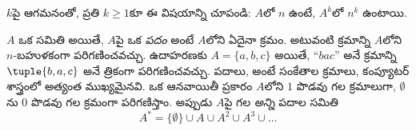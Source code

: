 \documentclass[../../../include/open-logic-section]{subfiles}
\begin{document}
\begin{prob}
$k$పై ఆగమనంతో, ప్రతి $k \ge 1$కూ ఈ విషయాన్ని చూపండి:
$A$లో $n$  ఉంటే, $A^k$లో $n^k$  ఉంటాయి.
\end{prob}

\begin{ex}
$A$ ఒక సమితి అయితే, $A$పై ఒక \emph{పదం} అంటే $A$లోని
 ఏదైనా క్రమం. అటువంటి క్రమాన్ని $A$లోని
 $n$-బహుళకంగా పరిగణించవచ్చు.
ఉదాహరణకు $A = \{a, b, c\}$ అయితే, ``$bac$'' అనే క్రమాన్ని
$\tuple{b, a, c}$ అనే త్రికంగా పరిగణించవచ్చు.
పదాలు, అంటే సంకేతాల క్రమాలు, కంప్యూటర్ శాస్త్రంలో అత్యంత ముఖ్యమైనవి.
ఒక ఆనవాయితీ ప్రకారం $A$లోని 
$1$ పొడవు గల క్రమాలుగా, $\emptyset$ను $0$ పొడవు గల క్రమంగా
పరిగణిస్తాం. అప్పుడు $A$పై గల \emph{అన్ని} పదాల సమితి
\[
A^* = \{\emptyset\} \cup A \cup A^2 \cup A^3 \cup \dots
\]
\end{ex}
\end{document}
